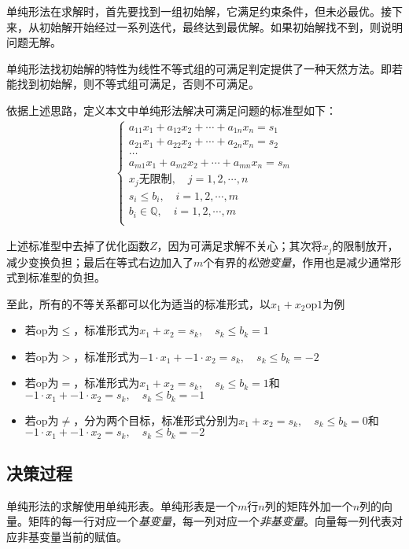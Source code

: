 单纯形法在求解时，首先要找到一组初始解，它满足约束条件，但未必最优。接下来，从初始解开始经过一系列迭代，最终达到最优解。如果初始解找不到，则说明问题无解。

单纯形法找初始解的特性为线性不等式组的可满足判定提供了一种天然方法。即若能找到初始解，则不等式组可满足，否则不可满足。

依据上述思路，定义本文中单纯形法解决可满足问题的标准型如下：
\begin{eqnarray*}
  \begin{cases}
    a_{11}x_1 + a_{12}x_2 + \cdots + a_{1n}x_n = s_1 \\
    a_{21}x_1 + a_{22}x_2 + \cdots + a_{2n}x_n = s_2 \\
    \dots \\
    a_{m1}x_1 + a_{m2}x_2 + \cdots + a_{mn}x_n = s_m \\
    x_j \textrm{无限制}, \quad j = 1, 2, \cdots, n \\
    s_i \leq b_i, \quad i = 1, 2, \cdots, m \\
    b_i \in \mathbb{Q}, \quad i = 1, 2, \cdots, m \\
  \end{cases}
\end{eqnarray*}

上述标准型中去掉了优化函数$Z$，因为可满足求解不关心；其次将$x_j$的限制放开，减少变换负担；最后在等式右边加入了$m$个有界的\emph{松弛变量}，作用也是减少通常形式到标准型的负担。

至此，所有的不等关系都可以化为适当的标准形式，以$x_1+x_2 \mathrm{op} 1$为例
\begin{itemize}
  \item 若op为$\leq$，标准形式为$x_1+x_2 = s_k, \quad s_k \leq b_k = 1$
  \item 若op为$>$，标准形式为$-1 \cdot x_1 + -1 \cdot x_2 = s_k, \quad s_k \leq b_k = -2$
  \item 若op为$=$，标准形式为$x_1+x_2 = s_k, \quad s_k \leq b_k = 1$和$-1 \cdot x_1 + -1 \cdot x_2 = s_k, \quad s_k \leq b_k = -1$
  \item 若op为$\neq$，分为两个目标，标准形式分别为$x_1+x_2 = s_k, \quad s_k \leq b_k = 0$和$-1 \cdot x_1 + -1 \cdot x_2 = s_k, \quad s_k \leq b_k = -2$
\end{itemize}

\subsection{决策过程}
单纯形法的求解使用单纯形表。单纯形表是一个$m$行$n$列的矩阵外加一个$n$列的向量。矩阵的每一行对应一个\emph{基变量}，每一列对应一个\emph{非基变量}。向量每一列代表对应非基变量当前的赋值。

